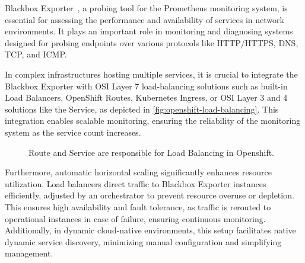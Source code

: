 Blackbox Exporter~\parencite{BlackboxExporter}, a probing tool for the Prometheus monitoring system, is essential for assessing the performance and availability of services in network environments. It plays an important role in monitoring and diagnosing systems designed for probing endpoints over various protocols like \ac{HTTP}/\ac{HTTPS}, \ac{DNS}, \ac{TCP}, and \ac{ICMP}. 

In complex infrastructures hosting multiple services, it is crucial to integrate the Blackbox Exporter with \ac{OSI} Layer 7 load-balancing solutions such as built-in Load Balancers, OpenShift Routes, Kubernetes Ingress, or \ac{OSI} Layer 3 and 4 solutions like the Service, as depicted in \autoref{fig:openshift-load-balancing}. This integration enables scalable monitoring, ensuring the reliability of the monitoring system as the service count increases. 

\begin{figure}[htpb]
  \centering
  \caption[OpenShift Load Balancing]{Route and Service are responsible for Load Balancing in Openshift.}\label{fig:openshift-load-balancing}
\end{figure}

Furthermore, automatic horizontal scaling significantly enhances resource utilization. Load balancers direct traffic to Blackbox Exporter instances efficiently, adjusted by an orchestrator to prevent resource overuse or depletion. This ensures high availability and fault tolerance, as traffic is rerouted to operational instances in case of failure, ensuring continuous monitoring. Additionally, in dynamic cloud-native environments, this setup facilitates native dynamic service discovery, minimizing manual configuration and simplifying management.

